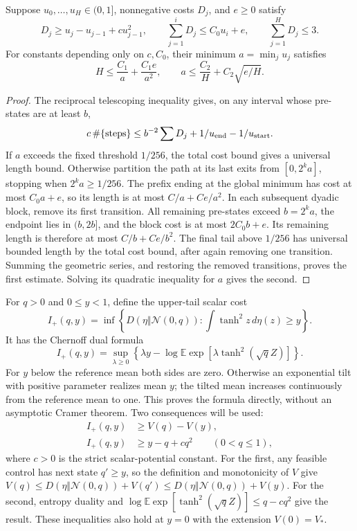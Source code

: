 \begin{lemma}
\label{lem:finite-width-additive-occupation}
Suppose $u_0,\ldots,u_H\in(0,1]$, nonnegative costs $D_j$, and
$e\ge0$ satisfy
\[
 D_j\ge u_j-u_{j-1}+cu_{j-1}^2,\qquad
 \sum_{j=1}^iD_j\le C_0u_i+e,\qquad
 \sum_{j=1}^HD_j\le3.
\]
For constants depending only on $c,C_0$, their minimum
$a=\min_j u_j$ satisfies
\[
 H\le\frac{C_1}{a}+\frac{C_1e}{a^2},\qquad
 a\le\frac{C_2}{H}+C_2\sqrt{e/H}.
\]
\end{lemma}
\begin{proof}
The reciprocal telescoping inequality gives, on any interval whose
pre-states are at least $b$,
\[
 c\,\#\{\text{steps}\}
 \le b^{-2}\sum D_j+1/u_{\rm end}-1/u_{\rm start}.
\]
If $a$ exceeds the fixed threshold $1/256$, the total cost bound
gives a universal length bound. Otherwise partition the path at its
last exits from $[0,2^ka]$, stopping when $2^ka\ge1/256$.
The prefix ending at the global minimum has cost at most $C_0a+e$,
so its length is at most $C/a+Ce/a^2$.
In each subsequent dyadic block, remove its first transition. All
remaining pre-states exceed $b=2^ka$, the endpoint lies in $(b,2b]$,
and the block cost is at most $2C_0b+e$. Its remaining length is
therefore at most $C/b+Ce/b^2$. The final tail above $1/256$ has
universal bounded length by the total cost bound, after again removing
one transition. Summing the geometric series, and restoring the
removed transitions, proves the first estimate. Solving its quadratic
inequality for $a$ gives the second.
\end{proof}

For $q>0$ and $0\le y<1$, define the upper-tail scalar cost
\[
 I_+(q,y)=\inf\left\{
 D(\eta\Vert\mathcal N(0,q)):
       \int\tanh^2z\,d\eta(z)\ge y\right\}.
\]
It has the Chernoff dual formula
\begin{equation}\label{eq:upper-tail-scalar-dual}
 I_+(q,y)=\sup_{\lambda\ge0}
 \left\{\lambda y-
   \log\mathbb E\exp[\lambda\tanh^2(\sqrt q Z)]\right\}.
\end{equation}
For $y$ below the reference mean both sides are zero. Otherwise an
exponential tilt with positive parameter realizes mean $y$; the tilted
mean increases continuously from the reference mean to one.
This proves the formula directly, without an asymptotic Cramer theorem.
Two consequences will be used:
\begin{align}
 I_+(q,y)&\ge V(q)-V(y),
       \label{eq:upper-tail-bellman}\\
 I_+(q,y)&\ge y-q+cq^2\qquad(0<q\le1),
       \label{eq:upper-tail-dissipation}
\end{align}
where $c>0$ is the strict scalar-potential constant.
For the first, any feasible control has next state $q'\ge y$,
so the definition and monotonicity of $V$ give
$V(q)\le D(\eta\Vert\mathcal N(0,q))+V(q')
\le D(\eta\Vert\mathcal N(0,q))+V(y)$.
For the second, entropy duality and
$\log\mathbb E\exp[\tanh^2(\sqrt qZ)]\le q-cq^2$
give the result. These inequalities also hold at $y=0$ with the
extension $V(0)=V_*$.

